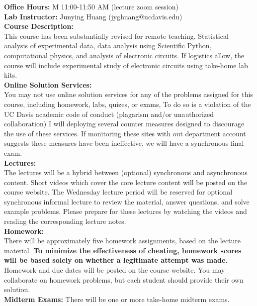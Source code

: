 \documentclass[12pt]{article}
\begin{document}
\noindent
\textbf{Office Hours:} M 11:00-11:50 AM (lecture zoom session) \\

\noindent
\textbf{Lab Instructor:} Junying Huang (jyghuang@ucdavis.edu) \\

\noindent
\textbf {Course Description:}\\
This course has been substantially revised for remote teaching.
Statistical analysis of experimental data, data analysis using
Scientific Python, computational physics, and analysis of electronic
circuits.  If logistics allow, the course will include experimental
study of electronic circuits using take-home lab kits. \\

\noindent
\textbf{Online Solution Services:}\\
You may not use online solution services for any of the problems
assigned for this course, including homework, labs, quizes, or exams,
To do so is a violation of the UC Davis academic code of conduct
(plagarism and/or unauthorized collaboration) I will deploying several
counter measures designed to discourage the use of these services.  If
monitoring these sites with out department account suggests these
measures have been ineffective, we will have a synchronous final exam.\\

\noindent
\textbf{Lectures:}\\
The lectures will be a hybrid between (optional) synchronous and asynchronous content. Short videos which cover the core lecture content will be posted on the course website.  The Wednesday lecture period will be reserved for optional synchronous informal lecture to review the material, answer questions, and solve example problems.  Please prepare for these lectures by watching the videos and reading the corresponding lecture notes.\\

\noindent
\textbf{Homework:}\\
There will be approximately five homework assignments, based on the
lecture material.  {\bf To minimize the effectiveness of cheating, homework
scores will be based solely on whether a legitimate attempt was made.}
Homework and due dates will be posted on the course website.  You may
collaborate on homework problems, but each student should provide
their own solution.\\

\noindent
\textbf{Midterm Exams:} There will be one or more take-home midterm exams. \\
\end{document}
